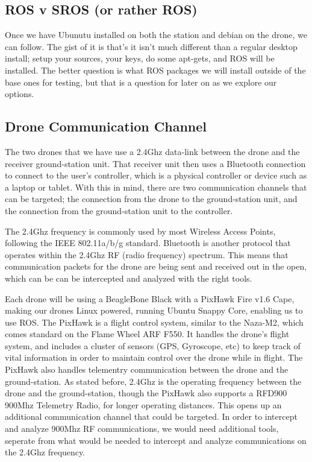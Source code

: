 \documentclass[IEEEtran,letterpaper,10pt,titlepage,draftclsnofoot,onecolumn]{article}
\begin{document}
\subsection*{ROS v SROS (or rather ROS)}
Once we have Ubunutu installed on both the station and debian on the drone, we can follow\cite{Indigo}.
The gist of it is that's it isn't much different than a regular desktop install; setup your sources, your keys, do some
apt-gets, and ROS will be installed. The better question is what ROS packages we will install outside of the base ones for 
testing, but that is a question for later on as we explore our options.

\subsection*{Drone Communication Channel}
The two drones that we have use a 2.4Ghz data-link between the drone and the receiver ground-station unit.
That receiver unit then uses a Bluetooth connection to connect to the user's controller, which is a physical controller
or device such as a laptop or tablet.\cite{NazaM2} With this in mind, there are two communication channels that can be
targeted; the connection from the drone to the ground-station unit, and the connection from the ground-station unit
to the controller\cite{NazaM2}.

The 2.4Ghz frequency is commonly used by most Wireless Access Points, following the IEEE 802.11a/b/g
standard. Bluetooth is another protocol that operates within the 2.4Ghz RF (radio frequency)
spectrum\cite{HakDaSpectrum}. This means that communication packets for the drone are being sent and received out in the
open, which can be can be intercepted and analyzed with the right tools.

Each drone will be using a BeagleBone Black with a PixHawk Fire v1.6 Cape, making our drones Linux powered, running
Ubuntu Snappy Core, enabling us to use ROS\cite{PixHawk}. The PixHawk is a flight control system, similar to the
Naza-M2, which comes standard on the Flame Wheel ARF F550. It handles the drone's flight system, and includes a cluster
of sensors (GPS, Gyroscope, etc) to keep track of vital information in order to maintain control over the drone while
in flight. The PixHawk also handles telementry communication between the drone and the ground-station. As stated before,
2.4Ghz is the operating frequency between the drone and the ground-station, though the PixHawk also supports a RFD900
900Mhz Telemetry Radio, for longer operating distances\cite{PixHawkDocs}. This opens up an additional communication
channel that could be targeted. In order to intercept and analyze 900Mhz RF communications, we would need additional
tools, seperate from what would be needed to intercept and analyze communications on the 2.4Ghz
frequency\cite{HakDaSpectrum900}.
\end{document}
